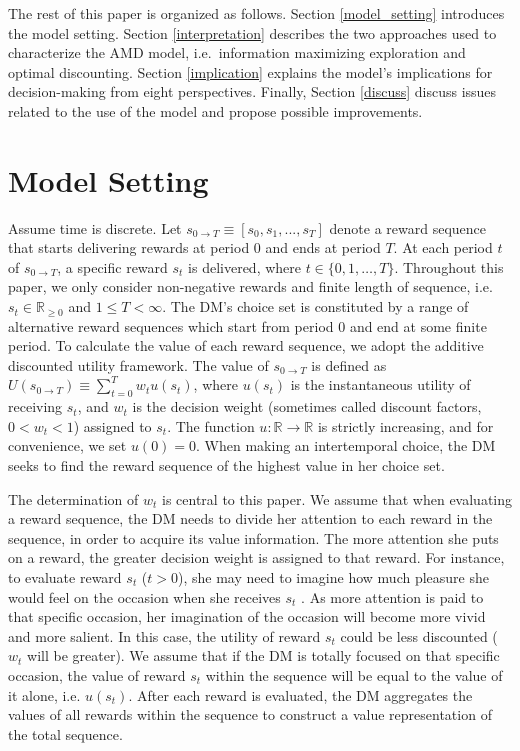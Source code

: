 \documentclass[
  12pt,
]{article}
\begin{document}
The rest of this paper is organized as follows. Section
\ref{model_setting} introduces the model setting. Section
\ref{interpretation} describes the two approaches used to characterize
the AMD model, i.e.~information maximizing exploration and optimal
discounting. Section \ref{implication} explains the model's implications
for decision-making from eight perspectives. Finally, Section
\ref{discuss} discuss issues related to the use of the model and propose
possible improvements.

\hypertarget{model-setting}{%
\section{\texorpdfstring{Model Setting
\label{model_setting}}{Model Setting }}\label{model-setting}}

Assume time is discrete. Let
\(s_{0\rightarrow T}\equiv[s_0,s_1,...,s_T]\) denote a reward sequence
that starts delivering rewards at period 0 and ends at period \(T\). At
each period \(t\) of \(s_{0\rightarrow T}\), a specific reward \(s_t\)
is delivered, where \(t\in\{0,1,…,T\}\). Throughout this paper, we only
consider non-negative rewards and finite length of sequence,
i.e.~\(s_t \in \mathbb{R}_{\geq 0}\) and \(1\leq T<\infty\). The DM's
choice set is constituted by a range of alternative reward sequences
which start from period 0 and end at some finite period. To calculate
the value of each reward sequence, we adopt the additive discounted
utility framework. The value of \(s_{0\rightarrow T}\) is defined as
\(U(s_{0\rightarrow T})\equiv \sum_{t=0}^T w_{t}u(s_t)\), where
\(u(s_t)\) is the instantaneous utility of receiving \(s_t\), and
\(w_t\) is the decision weight (sometimes called discount factors,
\(0<w_t<1\)) assigned to \(s_t\). The function
\(u:\mathbb{R}\rightarrow \mathbb{R}\) is strictly increasing, and for
convenience, we set \(u(0)=0\). When making an intertemporal choice, the
DM seeks to find the reward sequence of the highest value in her choice
set.

The determination of \(w_t\) is central to this paper. We assume that
when evaluating a reward sequence, the DM needs to divide her attention
to each reward in the sequence, in order to acquire its value
information. The more attention she puts on a reward, the greater
decision weight is assigned to that reward. For instance, to evaluate
reward \(s_t\) (\(t>0\)), she may need to imagine how much pleasure she
would feel on the occasion when she receives \(s_t\)
\citep{macinnis1987role}. As more attention is paid to that specific
occasion, her imagination of the occasion will become more vivid and
more salient. In this case, the utility of reward \(s_t\) could be less
discounted (\(w_t\) will be greater). We assume that if the DM is
totally focused on that specific occasion, the value of reward \(s_t\)
within the sequence will be equal to the value of it alone, i.e.
\(u(s_t)\). After each reward is evaluated, the DM aggregates the values
of all rewards within the sequence to construct a value representation
of the total sequence.
\end{document}
